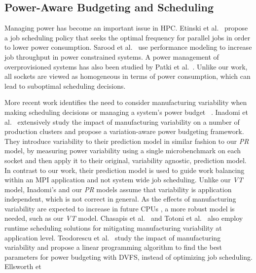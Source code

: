 \subsection{Power-Aware Budgeting and Scheduling} Managing power has become an important
issue in HPC.  Etinski et al.~\cite{5999809} propose a job scheduling policy that seeks
the optimal frequency for parallel jobs in order to lower power consumption.  Sarood et
al.~\cite{Sarood:2014:MTO:2683593.2683682} use performance modeling to increase job
throughput in power constrained systems.  A power management of overprovisioned systems
has also been studied by Patki et al.~\cite{patki:2013:eho:2464996.2465009,7515666}.
Unlike our work, all sockets are viewed as homogeneous in terms of power consumption,
which can lead to suboptimal scheduling decisions.
\par
More recent work identifies the need to consider manufacturing variability when making
scheduling decisions or managing a system's power budget
~\cite{Chasapis:2016:RMM:2925426.2926279,Inadomi:2015:AMI:2807591.2807638,Gholkar:2016:PTH:2967938.2967961,Ellsworth:2015:DPS:2807591.2807643,Bailey:2015:FLP:2807591.2807637,Teodorescu:2008:VAS:1381306.1382152,Totoni:tech:2014}.
Inadomi et al.~\cite{Inadomi:2015:AMI:2807591.2807638} extensively study the impact of
manufacturing variability on a number of production clusters and propose a variation-aware
power budgeting framework.  They introduce variability to their prediction model in
similar fashion to our \textit{PR} model, by measuring power variability using a single
microbenchmark on each socket and then apply it to their original, variability agnostic,
prediction model.    In contrast to our work, their prediction model is used to guide work
balancing within an MPI application and not system wide job scheduling.  Unlike our
\textit{VT} model, Inadomi's and our \textit{PR} models assume that variability is
application independent, which is not correct in general.  As the effects of manufacturing
variability are expected to increase in future CPUs
\cite{Marathe:2017:ESP:3149412.3149421}, a more robust model is needed, such as our
\textit{VT} model.  Chasapis et al.~\cite{Chasapis:2016:RMM:2925426.2926279} and Totoni et
al.~\cite{Totoni:tech:2014} also employ runtime scheduling solutions for mitigating
manufacturing variability at application level.  Teodorescu et
al.~\cite{Teodorescu:2008:VAS:1381306.1382152} study the impact of manufacturing
variability and propose a linear programming algorithm to find the best parameters for
power budgeting with DVFS, instead of optimizing job scheduling.  Ellsworth et
